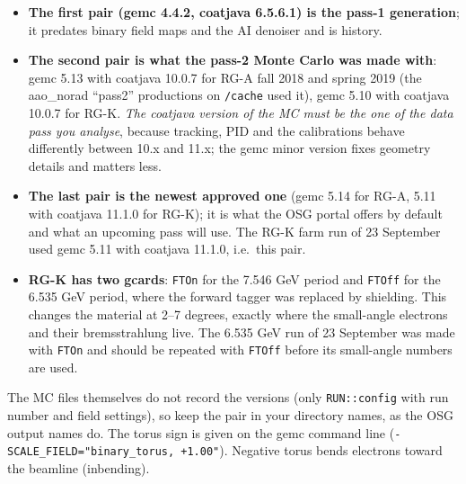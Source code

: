 \documentclass[11pt]{article}
\begin{document}
\begin{itemize}
\item \textbf{The first pair (gemc 4.4.2, coatjava 6.5.6.1) is the pass-1 generation}; it predates
  binary field maps and the AI denoiser and is history.
\item \textbf{The second pair is what the pass-2 Monte Carlo was made with}: gemc 5.13 with coatjava
  10.0.7 for RG-A fall 2018 and spring 2019 (the aao\_norad ``pass2'' productions on
  \texttt{/cache} used it), gemc 5.10 with coatjava 10.0.7 for RG-K. \emph{The coatjava version of
  the MC must be the one of the data pass you analyse}, because tracking, PID and the
  calibrations behave differently between 10.x and 11.x; the gemc minor version fixes geometry
  details and matters less.
\item \textbf{The last pair is the newest approved one} (gemc 5.14 for RG-A, 5.11 with coatjava
  11.1.0 for RG-K); it is what the OSG portal offers by default and what an upcoming pass will use.
  The RG-K farm run of 23 September used gemc 5.11 with coatjava 11.1.0, i.e.\ this pair.
\item \textbf{RG-K has two gcards}: \texttt{FTOn} for the 7.546 GeV period and \texttt{FTOff} for
  the 6.535 GeV period, where the forward tagger was replaced by shielding. This changes the
  material at 2--7 degrees, exactly where the small-angle electrons and their bremsstrahlung
  live. The 6.535 GeV run of 23 September was made with \texttt{FTOn} and should be repeated with
  \texttt{FTOff} before its small-angle numbers are used.
\end{itemize}
The MC files themselves do not record the versions (only \texttt{RUN::config} with run number and
field settings), so keep the pair in your directory names, as the OSG output names do.
The torus sign is given on the gemc command line (\texttt{-SCALE\_FIELD="binary\_torus, +1.00"}).
Negative torus bends electrons toward the beamline (inbending).
\end{document}
